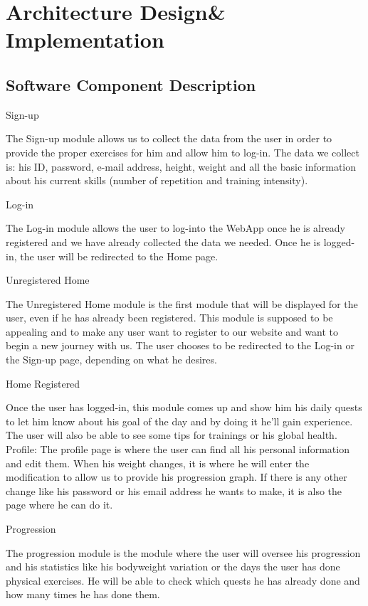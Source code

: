\documentclass[conference]{IEEEtran}
\begin{document}
\section{Architecture Design& Implementation}
\subsection{Software Component Description}
\begin{flushleft}
    \br
    Sign-up 
\end{flushleft} 
The Sign-up module allows us to collect the data from the user in order to provide the proper exercises for him and allow him to log-in. The data we collect is: his ID, password, e-mail address, height, weight and all the basic information about his current skills (number of repetition and training intensity). 

\begin{flushleft}
    \br
    Log-in
\end{flushleft} 
The Log-in module allows the user to log-into the WebApp once he is already registered and we have already collected the data we needed. Once he is logged-in, the user will be redirected to the Home page. 

\begin{flushleft}
    \br
    Unregistered Home
\end{flushleft}  
The Unregistered Home module is the first module that will be displayed for the user, even if he has already been registered. This module is supposed to be appealing and to make any user want to register to our website and want to begin a new journey with us. The user chooses to be redirected to the Log-in or the Sign-up page, depending on what he desires. 

\begin{flushleft}
    \br
    Home Registered
\end{flushleft} 
Once the user has logged-in, this module comes up and show him his daily quests to let him know about his goal of the day and by doing it he’ll gain experience. The user will also be able to see some tips for trainings or his global health. 
Profile: The profile page is where the user can find all his personal information and edit them. When his weight changes, it is where he will enter the modification to allow us to provide his progression graph. If there is any other change like his password or his email address he wants to make, it is also the page where he can do it. 

\begin{flushleft}
    \br
    Progression
\end{flushleft}
The progression module is the module where the user will oversee his progression and his statistics like his bodyweight variation or the days the user has done physical exercises. He will be able to check which quests he has already done and how many times he has done them. 
\end{document}
